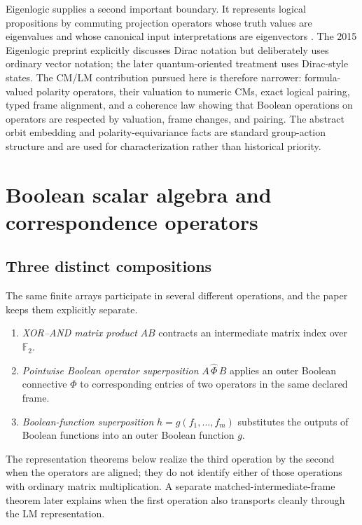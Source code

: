 \documentclass[11pt]{article}
\theoremstyle{definition}
\theoremstyle{remark}
\newcommand{\F}{\mathbb F}
\begin{document}
Eigenlogic supplies a second important boundary.  It represents logical propositions by commuting projection operators whose truth values are eigenvalues and whose canonical input interpretations are eigenvectors \cite{Toffano2015,DuboisToffano2016}.  The 2015 Eigenlogic preprint explicitly discusses Dirac notation but deliberately uses ordinary vector notation; the later quantum-oriented treatment uses Dirac-style states.  The CM/LM contribution pursued here is therefore narrower: formula-valued polarity operators, their valuation to numeric CMs, exact logical pairing, typed frame alignment, and a coherence law showing that Boolean operations on operators are respected by valuation, frame changes, and pairing.  The abstract orbit embedding and polarity-equivariance facts are standard group-action structure and are used for characterization rather than historical priority.

\section{Boolean scalar algebra and correspondence operators}
\label{sec:cm}

\subsection{Three distinct compositions}

The same finite arrays participate in several different operations, and the paper keeps them explicitly separate.
\begin{enumerate}
\item \emph{XOR--AND matrix product} $AB$ contracts an intermediate matrix index over $\F_2$.
\item \emph{Pointwise Boolean operator superposition} $A\,\widehat\Phi\,B$ applies an outer Boolean connective $\Phi$ to corresponding entries of two operators in the same declared frame.
\item \emph{Boolean-function superposition} $h=g(f_1,\ldots,f_m)$ substitutes the outputs of Boolean functions into an outer Boolean function $g$.
\end{enumerate}
The representation theorems below realize the third operation by the second when the operators are aligned; they do not identify either of those operations with ordinary matrix multiplication.  A separate matched-intermediate-frame theorem later explains when the first operation also transports cleanly through the LM representation.
\end{document}

